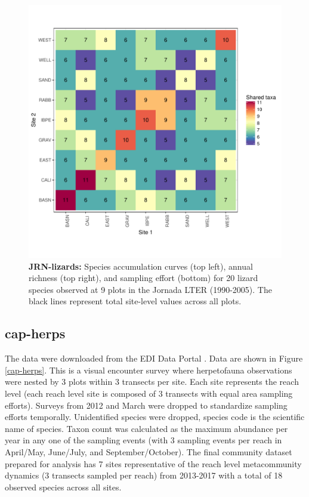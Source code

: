 \documentclass[11pt, oneside]{article}
\begin{document}
\begin{figure}[h!]
\includegraphics[scale = 0.4]{jrn-lizards-hope_spp_shared.pdf}
\caption{{\bf JRN-lizards:} Species accumulation curves (top left),  annual richness (top right), and sampling effort (bottom)  for 20 lizard species observed at 9 plots in the Jornada LTER (1990-2005). The black lines represent total site-level values across all plots.}
\label{jrn-lizards}
\end{figure}



\subsection {cap-herps}
The data were downloaded from the EDI Data Portal \citep{cap-herps}.
Data are shown in Figure \ref{cap-herps}.
This is a visual encounter survey where herpetofauna observations were nested by 3 plots within 3 transects per site. 
Each site represents the reach level (each reach level site is composed of 3 transects with equal area sampling efforts). 
Surveys from 2012 and March were dropped to standardize sampling efforts temporally. 
Unidentified species were dropped, species code is the scientific name of species. 
Taxon count was calculated as the maximum abundance per year in any one of the sampling events (with 3 sampling events per reach in April/May, June/July, and September/October). 
The final community dataset prepared for analysis has 7 sites representative of the reach level metacommunity dynamics (3 transects sampled per reach) from 2013-2017 with a total of 18 observed species across all sites.  
\end{document}
